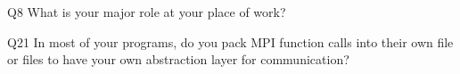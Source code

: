 \begin{description}%
\item{Q8} What is your major role at your place of work?%
\item{Q21} In most of your programs, do you pack MPI function calls into their own file or files to have your own abstraction layer for communication?%
\end{description}%
